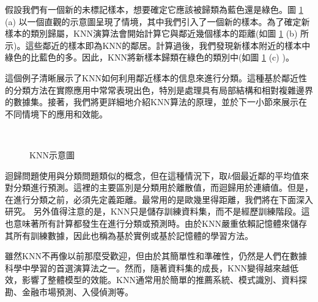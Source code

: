 假設我們有一個新的未標記樣本，想要確定它應該被歸類為藍色還是綠色。圖 \ref{fig:knn示意圖} (a) 以一個直觀的示意圖呈現了情境，其中我們引入了一個新的樣本。為了確定新樣本的類別歸屬，KNN演算法會開始計算它與鄰近幾個樣本的距離(如圖 \ref{fig:knn示意圖} (b) 所示)。這些鄰近的樣本即為KNN的鄰居。計算過後，我們發現新樣本附近的樣本中綠色的比藍色的多。因此，KNN將新樣本歸類在綠色的類別中(如圖 \ref{fig:knn示意圖} (c) )。

這個例子清晰展示了KNN如何利用鄰近樣本的信息來進行分類。這種基於鄰近性的分類方法在實際應用中常常表現出色，特別是處理具有局部結構和相對複雜邊界的數據集。接著，我們將更詳細地介紹KNN算法的原理，並於下一小節來展示在不同情境下的應用和效能。
\\
\begin{figure}[H]
    \centering
        \\
    \caption{KNN示意圖}
    \label{fig:knn示意圖}
\end{figure}

迴歸問題使用與分類問題類似的概念，但在這種情況下，取$k$個最近鄰的平均值來對分類進行預測。這裡的主要區別是分類用於離散值，而迴歸用於連續值。但是，在進行分類之前，必須先定義距離。最常用的是歐幾里得距離，我們將在下面深入研究。
另外值得注意的是，KNN只是儲存訓練資料集，而不是經歷訓練階段。這也意味著所有計算都發生在進行分類或預測時。由於KNN嚴重依賴記憶體來儲存其所有訓練數據，因此也稱為基於實例或基於記憶體的學習方法。

雖然KNN不再像以前那麼受歡迎，但由於其簡單性和準確性，仍然是人們在數據科學中學習的首選演算法之一。然而，隨著資料集的成長，KNN變得越來越低效，影響了整體模型的效能。KNN通常用於簡單的推薦系統、模式識別、資料探勘、金融市場預測、入侵偵測等。 

